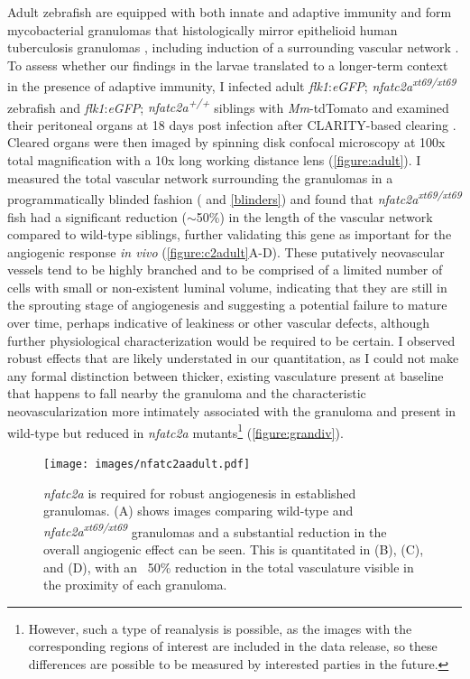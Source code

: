 Adult zebrafish are equipped with both innate and adaptive immunity and form mycobacterial granulomas that histologically mirror epithelioid human tuberculosis granulomas \citep{Swaim2006}, including induction of a surrounding vascular network \citep{Cronan2015}. To assess whether our findings in the larvae translated to a longer\hyp{}term context in the presence of adaptive immunity, I infected adult \textit{flk1}:\textit{eGFP}; \textit{nfatc2a\textsuperscript{xt69/xt69}} zebrafish and \textit{flk1}:\textit{eGFP}; \textit{nfatc2a\textsuperscript{+/+}} siblings with \textit{Mm}\hyp{}tdTomato and examined their peritoneal organs at 18 days post infection after CLARITY\hyp{}based clearing \citep{Chung2013, Cronan2015}. Cleared organs were then imaged by spinning disk confocal microscopy at 100x total magnification with a 10x long working distance lens (\autoref{figure:adult}). I measured the total vascular network surrounding the granulomas in a programmatically blinded fashion (\citet{Salter2016} and \autoref{blinders}) and found that \textit{nfatc2a\textsuperscript{xt69/xt69}} fish had a significant reduction (${\sim}$50\%) in the length of the vascular network compared to wild\hyp{}type siblings, further validating this gene as important for the angiogenic response \textit{in vivo} (\autoref{figure:c2adult}A\hyp{}D). These putatively neovascular vessels tend to be highly branched and to be comprised of a limited number of cells with small or non\hyp{}existent luminal volume, indicating that they are still in the sprouting stage of angiogenesis and suggesting a potential failure to mature over time, perhaps indicative of leakiness or other vascular defects, although further physiological characterization would be required to be certain. I observed robust effects that are likely understated in our quantitation, as I could not make any formal distinction between thicker, existing vasculature present at baseline that happens to fall nearby the granuloma and the characteristic neovascularization more intimately associated with the granuloma and present in wild\hyp{}type but reduced in \textit{nfatc2a} mutants\footnote{However, such a type of reanalysis is possible, as the images with the corresponding regions of interest are included in the data release, so these differences are possible to be measured by interested parties in the future.} (\autoref{figure:grandiv}).

\begin{figure}
\centering
\texttt{[image: images/nfatc2aadult.pdf]}
\caption[\textit{nfatc2a} is necessary for angiogenesis in adult granulomas]{\textit{nfatc2a} is required for robust angiogenesis in established granulomas. (A) shows images comparing wild\hyp{}type and \textit{nfatc2a\textsuperscript{xt69/xt69}} granulomas and a substantial reduction in the overall angiogenic effect can be seen. This is quantitated in (B), (C), and (D), with an ~50\% reduction in the total vasculature visible in the proximity of each granuloma.}
\label{figure:c2adult}
\end{figure}

